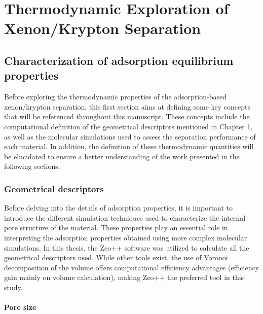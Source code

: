 \documentclass[main.tex]{subfiles}
\begin{document}
\chapter{Thermodynamic Exploration of Xenon/Krypton Separation}
\vspace*{-1\baselineskip}

\section{Characterization of adsorption equilibrium properties}

Before exploring the thermodynamic properties of the adsorption-based xenon/krypton separation, this first section aims at  defining some key concepts that will be referenced throughout this manuscript. These concepts include the computational definition of the geometrical descriptors mentioned in Chapter 1, as well as the molecular simulations used to assess the separation performance of each material. In addition, the definition of these thermodynamic quantities will be elucidated to ensure a better understanding of the work presented in the following sections.

\subsection{Geometrical descriptors}

Before delving into the details of adsorption properties, it is important to introduce the different simulation techniques used to characterize the internal pore structure of the material. These properties play an essential role in interpreting the adsorption properties obtained using more complex molecular simulations. In this thesis, the Zeo++ software was utilized to calculate all the geometrical descriptors used.\autocite{Zeo++} While other tools exist,\autocite{First_2013,PoreBlazer} the use of Voronoi decomposition of the volume offers computational efficiency advantages (efficiency gain mainly on volume calculation),\autocite{Rycroft_2009} making Zeo++ the preferred tool in this study.

\subsubsection{Pore size}
\end{document}
